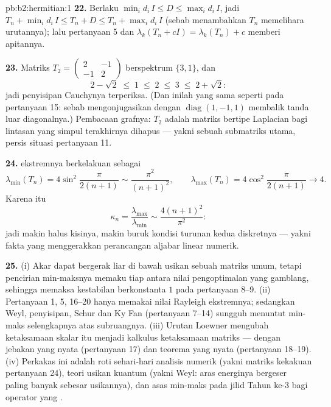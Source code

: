 \begin{solution}{pb:b2:hermitian:1}
\textbf{22.} Berlaku $\min_id_i\,I \leq D \leq \max_id_i\,I$, jadi $T_n +
\min_id_i\,I \leq T_n + D \leq T_n + \max_id_i\,I$
(sebab menambahkan $T_n$ memelihara urutannya); lalu pertanyaan 5 dan
$\lambda_k(T_n + cI) = \lambda_k(T_n) + c$ memberi apitannya.

\textbf{23.} Matriks $T_2 = \begin{pmatrix} 2 & -1\\ -1 &
2\end{pmatrix}$ berspektrum $\{3, 1\}$, dan
\[
2 - \sqrt2 \;\leq\; 1 \;\leq\; 2 \;\leq\; 3 \;\leq\; 2 +
\sqrt2 :
\]
jadi penyisipan Cauchynya terperiksa. (Dan inilah  yang sama seperti pada
pertanyaan 15: sebab mengonjugasikan dengan $\operatorname{diag}(1,-1,1)$ membalik
tanda luar diagonalnya.) Pembacaan grafnya: $T_2$ adalah
matriks bertipe Laplacian bagi lintasan yang simpul terakhirnya dihapus
--- yakni sebuah submatriks utama, persis situasi pertanyaan
11.

\textbf{24.}  ekstremnya berkelakuan sebagai
\[
\lambda_{\min}(T_n) = 4\sin^2\frac{\pi}{2(n+1)}
\sim \frac{\pi^2}{(n+1)^2},
\qquad
\lambda_{\max}(T_n) = 4\cos^2\frac{\pi}{2(n+1)}
\longrightarrow 4 .
\]
Karena itu
\[
\kappa_n = \frac{\lambda_{\max}}{\lambda_{\min}}
\sim \frac{4(n+1)^2}{\pi^2} :
\]
jadi makin halus kisinya, makin buruk kondisi turunan kedua
diskretnya --- yakni fakta yang menggerakkan perancangan aljabar linear
numerik.

\textbf{25.} (i) Akar  dapat
bergerak liar di bawah usikan sebuah matriks umum, tetapi
pencirian min-maksnya memaku tiap   antara
nilai pengoptimalan yang gamblang, sehingga memaksa kestabilan
 berkonstanta $1$ pada pertanyaan 8--9. (ii) Pertanyaan 1, 5, 16--20 hanya
memakai nilai Rayleigh ekstremnya; sedangkan Weyl, penyisipan, Schur dan
Ky Fan (pertanyaan 7--14) sungguh menuntut min-maks selengkapnya
atas subruangnya. (iii) Urutan Loewner mengubah ketaksamaan skalar
itu menjadi kalkulus ketaksamaan matriks --- dengan
jebakan yang nyata (pertanyaan 17) dan teorema yang nyata (pertanyaan 18--19).
(iv) Perkakas ini adalah roti sehari-hari analisis numerik
(yakni matriks kekakuan pertanyaan 24), teori usikan
kuantum (yakni Weyl: aras energinya bergeser paling banyak sebesar 
usikannya), dan asas min-maks pada jilid Tahun ke-3
bagi operator  yang .

\end{solution}
